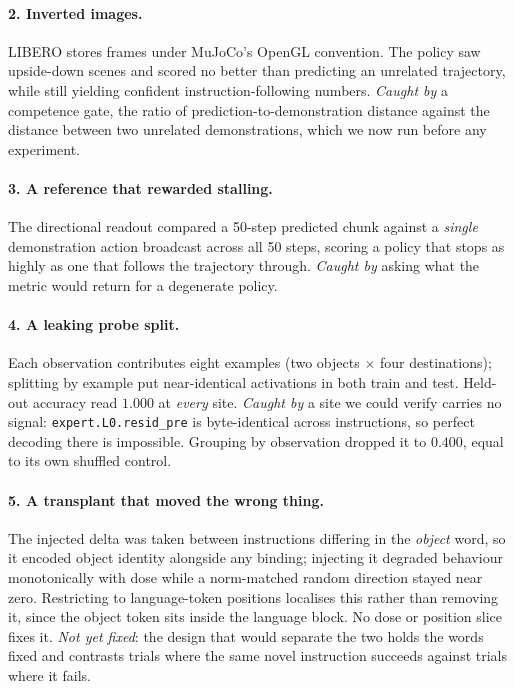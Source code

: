 \documentclass{article}
\begin{document}
\paragraph{2. Inverted images.} LIBERO stores frames under MuJoCo's OpenGL convention. The
policy saw upside-down scenes and scored no better than predicting an unrelated trajectory,
while still yielding confident instruction-following numbers. \emph{Caught by} a competence
gate, the ratio of prediction-to-demonstration distance against the distance between two
unrelated demonstrations, which we now run before any experiment.

\paragraph{3. A reference that rewarded stalling.} The directional readout compared a 50-step
predicted chunk against a \emph{single} demonstration action broadcast across all 50 steps,
scoring a policy that stops as highly as one that follows the trajectory through. \emph{Caught
by} asking what the metric would return for a degenerate policy.

\paragraph{4. A leaking probe split.} Each observation contributes eight examples (two objects
$\times$ four destinations); splitting by example put near-identical activations in both train
and test. Held-out accuracy read $1.000$ at \emph{every} site. \emph{Caught by} a site we could
verify carries no signal: \texttt{expert.L0.resid\_pre} is byte-identical across instructions,
so perfect decoding there is impossible. Grouping by observation dropped it to $0.400$, equal to
its own shuffled control.

\paragraph{5. A transplant that moved the wrong thing.} The injected delta was taken between
instructions differing in the \emph{object} word, so it encoded object identity alongside any
binding; injecting it degraded behaviour monotonically with dose while a norm-matched random
direction stayed near zero. Restricting to language-token positions localises this rather than
removing it, since the object token sits inside the language block. No dose or position slice
fixes it. \emph{Not yet fixed}: the design that would separate the two holds the words fixed and
contrasts trials where the same novel instruction succeeds against trials where it fails.
\end{document}
